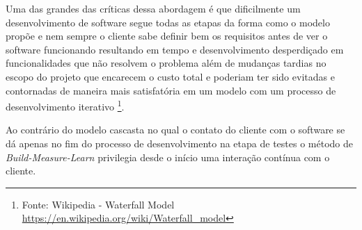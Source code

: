 \par Uma das grandes das críticas dessa abordagem é que dificilmente um desenvolvimento de software segue todas as etapas da forma como o modelo propõe e nem sempre o cliente sabe definir bem os requisitos antes de ver o software funcionando resultando em tempo e desenvolvimento desperdiçado em funcionalidades que não resolvem o problema além de mudanças tardias no escopo do projeto  que encarecem o custo total e poderiam ter sido evitadas e contornadas de maneira mais satisfatória  em um modelo com um processo de desenvolvimento iterativo \footnote{ Fonte: Wikipedia - Waterfall Model \url {https://en.wikipedia.org/wiki/Waterfall_model}}.
\par Ao contrário do modelo cascasta no qual o contato do cliente com o software se dá apenas no fim do processo de desenvolvimento na etapa de testes o método de \emph{Build-Measure-Learn} privilegia desde o início uma interação contínua com o cliente.

